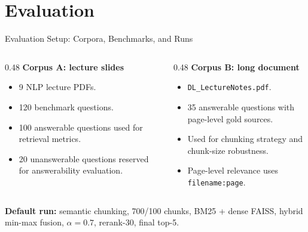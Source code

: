 \documentclass[10pt,aspectratio=169]{beamer}
\begin{document}
\section{Evaluation}

\begin{frame}{Evaluation Setup: Corpora, Benchmarks, and Runs}
    \begin{columns}[T,totalwidth=\textwidth]
        \begin{column}{0.48\textwidth}
            \textbf{Corpus A: lecture slides}
            \begin{itemize}
                \item 9 NLP lecture PDFs.
                \item 120 benchmark questions.
                \item 100 answerable questions used for retrieval metrics.
                \item 20 unanswerable questions reserved for answerability evaluation.
            \end{itemize}
        \end{column}
        \begin{column}{0.48\textwidth}
            \textbf{Corpus B: long document}
            \begin{itemize}
                \item \texttt{DL\_LectureNotes.pdf}.
                \item 35 answerable questions with page-level gold sources.
                \item Used for chunking strategy and chunk-size robustness.
                \item Page-level relevance uses \texttt{filename:page}.
            \end{itemize}
        \end{column}
    \end{columns}
    \vspace{0.6em}
    \textbf{Default run:} semantic chunking, 700/100 chunks, BM25 + dense FAISS,
    hybrid min-max fusion, $\alpha=0.7$, rerank-30, final top-5.
\end{frame}
\end{document}
